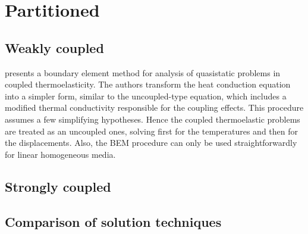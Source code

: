 
\section{Partitioned}

\subsection{Weakly coupled}

\cite{tanakaApplicationBoundaryElement1995} presents a boundary element method for analysis of quasistatic problems in coupled thermoelasticity.
The authors transform the heat conduction equation into a simpler form, similar to the uncoupled-type equation, which includes a modified thermal conductivity responsible for the coupling effects.
This procedure assumes a few simplifying hypotheses.
Hence the coupled thermoelastic problems are treated as an uncoupled ones, solving first for the temperatures and then for the displacements.
Also, the BEM procedure can only be used straightforwardly for linear homogeneous media.

\cite{}

\subsection{Strongly coupled}

\subsection{Comparison of solution techniques}
